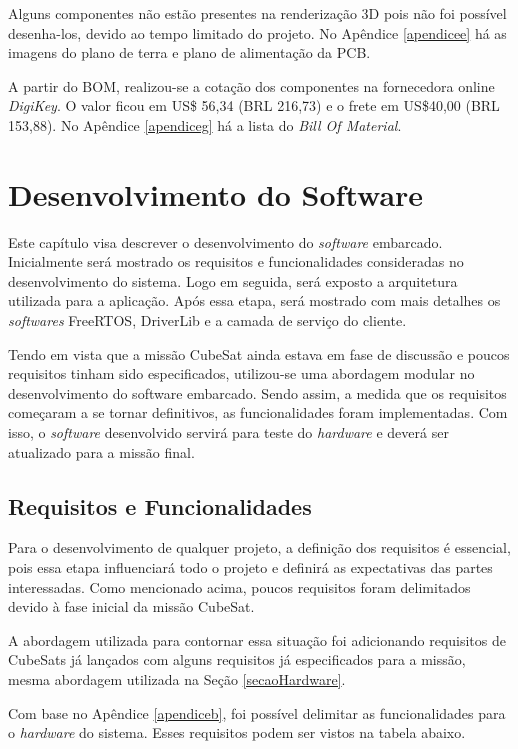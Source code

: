 Alguns componentes não estão presentes na renderização 3D pois não foi possível desenha-los, devido ao tempo limitado do projeto. No Apêndice \ref{apendicee} há as imagens do plano de terra e plano de alimentação da PCB.

A partir do BOM, realizou-se a cotação dos componentes na fornecedora online \textit{DigiKey}. O valor ficou em US\$ 56,34 (BRL 216,73) e o frete em US\$40,00 (BRL 153,88). No Apêndice \ref{apendiceg} há a lista do \textit{Bill Of Material}. 


\chapter[Desenvolvimento do Software]{Desenvolvimento do Software}

Este capítulo visa descrever o desenvolvimento do \textit{software} embarcado. Inicialmente será mostrado os requisitos e funcionalidades consideradas no desenvolvimento do sistema. Logo em seguida, será exposto a arquitetura utilizada para a aplicação. Após essa etapa, será mostrado com mais detalhes os \textit{softwares} FreeRTOS, DriverLib e a camada de serviço do cliente. 

Tendo em vista que a missão CubeSat ainda estava em fase de discussão e poucos requisitos tinham sido especificados, utilizou-se uma abordagem modular no desenvolvimento do software embarcado. Sendo assim, a medida que os requisitos começaram a se tornar definitivos, as funcionalidades foram implementadas. Com isso, o \textit{software} desenvolvido servirá para teste do \textit{hardware} e deverá ser atualizado para a missão final.

\section{Requisitos e Funcionalidades}

Para o desenvolvimento de qualquer projeto, a definição dos requisitos é essencial, pois essa etapa influenciará todo o projeto e definirá as expectativas das partes interessadas. Como mencionado acima, poucos requisitos foram delimitados devido à fase inicial da missão CubeSat.

A abordagem utilizada para contornar essa situação foi adicionando requisitos de CubeSats já lançados com alguns requisitos já especificados para a missão, mesma abordagem utilizada na Seção \ref{secaoHardware}.

Com base no Apêndice \ref{apendiceb}, foi possível delimitar as funcionalidades para o \textit{hardware} do sistema. Esses requisitos podem ser vistos na tabela abaixo.

